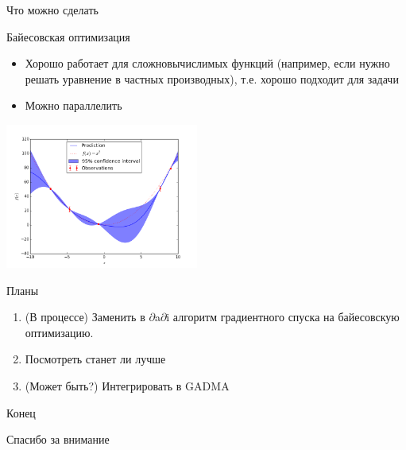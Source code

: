 \documentclass[presentation, smaller]{beamer}
\newcommand{\dadi}{$\partial$a$\partial$i\xspace }
\begin{document}
\begin{frame}[label={sec:org8ed920e}]{Что можно сделать}
\begin{block}{Байесовская оптимизация}
\begin{itemize}
\item Хорошо работает для сложновычислимых функций (например, если нужно решать
уравнение в частных производных), т.е. хорошо подходит для задачи
\item Можно параллелить
\end{itemize}
\begin{center}
\includegraphics[width=2.5in]{./pics/bayes.png}
\end{center}
\end{block}
\end{frame}

\begin{frame}[label={sec:orga0abadb}]{Планы}
\begin{enumerate}
\item (В процессе) Заменить в \dadi алгоритм градиентного спуска на байесовскую оптимизацию.
\item Посмотреть станет ли лучше
\item (Может быть?) Интегрировать в GADMA
\end{enumerate}
\end{frame}

\begin{frame}[label={sec:org3bc348d}]{Конец}
\begin{center}
Спасибо за внимание
\end{center}
\end{frame}
\end{document}
